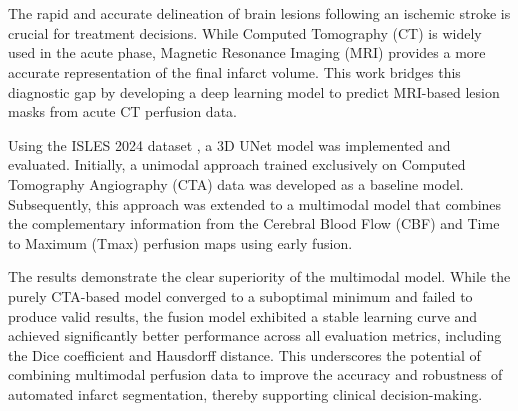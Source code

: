 \chapter*{\abstractname}
    The rapid and accurate delineation of brain lesions following an ischemic stroke is crucial for treatment decisions. While Computed Tomography (CT) is widely used in the acute phase, Magnetic Resonance Imaging (MRI) provides a more accurate representation of the final infarct volume. This work bridges this diagnostic gap by developing a deep learning model to predict MRI-based lesion masks from acute CT perfusion data.
    
    Using the ISLES 2024 dataset \cite{riedel2024isles}, a 3D UNet model was implemented and evaluated. Initially, a unimodal approach trained exclusively on Computed Tomography Angiography (CTA) data was developed as a baseline model. Subsequently, this approach was extended to a multimodal model that combines the complementary information from the Cerebral Blood Flow (CBF) and Time to Maximum (Tmax) perfusion maps using early fusion.
    
    The results demonstrate the clear superiority of the multimodal model. While the purely CTA-based model converged to a suboptimal minimum and failed to produce valid results, the fusion model exhibited a stable learning curve and achieved significantly better performance across all evaluation metrics, including the Dice coefficient and Hausdorff distance. This underscores the potential of combining multimodal perfusion data to improve the accuracy and robustness of automated infarct segmentation, thereby supporting clinical decision-making.


